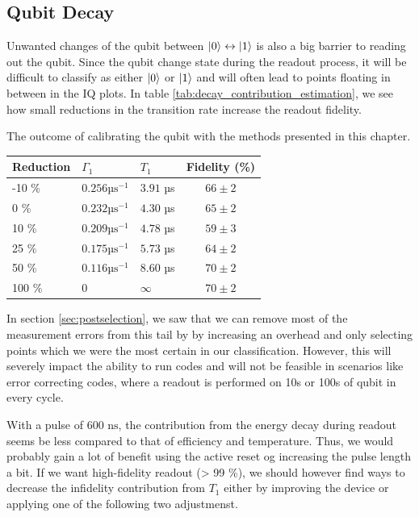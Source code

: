 \subsection{Qubit Decay}
Unwanted changes of the qubit between $\ket{0}\leftrightarrow\ket{1}$ is also a big barrier to reading out the qubit. Since the qubit change state during the readout process, it will be difficult to classify as either $\ket{0}$ or $\ket{1}$ and will often lead to points floating in between in the IQ plots. In table \ref{tab:decay_contribution_estimation}, we see how small reductions in the transition rate increase the readout fidelity. 
\begin{margintable}
\centering
\caption{The outcome of calibrating the qubit with the methods presented in this chapter.}
\vspace{0.3 cm}
\begin{tabular}{lll|c}
\hline
\textbf{Reduction}         &  $\Gamma_1$                  &  $T_1$        & Fidelity (\%)\\ \hline
-10 \%                     &  $0.256 \text{µs}^{-1}$         &  $3.91$ µs   &  $66 \pm 2$\\
0   \%                     &  $0.232 \text{µs}^{-1}$         &  $4.30$ µs   &  $65 \pm 2$\\
10  \%                     &  $0.209 \text{µs}^{-1}$         &  $4.78$ µs   &  $59 \pm 3$\\
25  \%                     &  $0.175 \text{µs}^{-1}$         &  $5.73$ µs   &  $64 \pm 2$\\
50  \%                     &  $0.116 \text{µs}^{-1}$         &  $8.60$ µs   &  $70 \pm 2$\\
100 \%                     &  $0$         &  $\infty$                       &  $70 \pm 2$\\
\end{tabular}
\label{tab:decay_contribution_estimation}
\end{margintable}
In section \ref{sec:postselection}, we saw that we can remove most of the measurement errors from this tail by by increasing an overhead and only selecting points which we were the most certain in our classification. However, this will severely impact the ability to run codes and will not be feasible in scenarios like error correcting codes, where a readout is performed on 10s or 100s of qubit in every cycle. 

With a pulse of $600 \text{ ns}$, the contribution from the energy decay during readout seems be less compared to that of efficiency and temperature. Thus, we would probably gain a lot of benefit using the active reset og increasing the pulse length a bit. If we want high-fidelity readout (> 99 \%), we should however find ways to decrease the infidelity contribution from $T_1$ either by improving the device or applying one of the following two adjustmenst.


